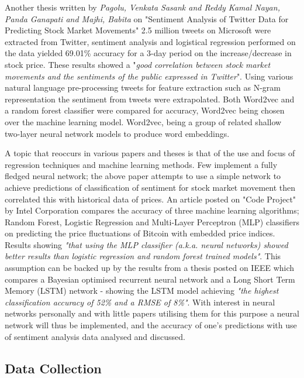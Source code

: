 \documentclass[oneside, 12pt]{article}
\begin{document}
		Another thesis written by \textit{Pagolu, Venkata Sasank and Reddy Kamal Nayan, Panda Ganapati and Majhi, Babita} \cite{SaTdpsmm} on "Sentiment Analysis of Twitter Data for Predicting Stock Market Movements" 2.5 million tweets on Microsoft were extracted from Twitter, sentiment analysis and logistical regression performed on the data yielded 69.01\% accuracy for a 3-day period on the increase/decrease in stock price. These results showed a "\textit{good correlation between stock market movements and the sentiments of the public expressed in Twitter}". Using various natural language pre-processing tweets for feature extraction such as N-gram representation the sentiment from tweets were extrapolated. Both Word2vec and a random forest classifier were compared for accuracy, Word2vec being chosen over the machine learning model. Word2vec, being a group of related shallow two-layer neural network models to produce word embeddings.
		
		A topic that reoccurs in various papers and theses is that of the use and focus of regression techniques and machine learning methods. Few implement a fully fledged neural network; the above paper attempts to use a simple network to achieve predictions of classification of sentiment for stock market movement then correlated this with historical data of prices. An article posted on "Code Project" by Intel Corporation \cite{StPNSentA} compares the accuracy of three machine learning algorithms; Random Forest, Logistic Regression and Multi-Layer Perceptron (MLP) classifiers on predicting the price fluctuations of Bitcoin with embedded price indices. Results showing \textit{"that using the MLP classifier (a.k.a. neural networks) showed better results than logistic regression and random forest trained models"}. This assumption can be backed up by the results from a thesis posted on IEEE \cite{MLBTCpred} which compares a Bayesian optimised recurrent neural network and a Long Short Term Memory (LSTM) network - showing the LSTM model achieving \textit{"the highest classification accuracy of 52\% and a RMSE of 8\%"}. With interest in neural networks personally and with little papers utilising them for this purpose a neural network will thus be implemented, and the accuracy of one's predictions with use of sentiment analysis data analysed and discussed.
			
		\subsection{Data Collection}\label{tweet_collection}
			
\end{document}
